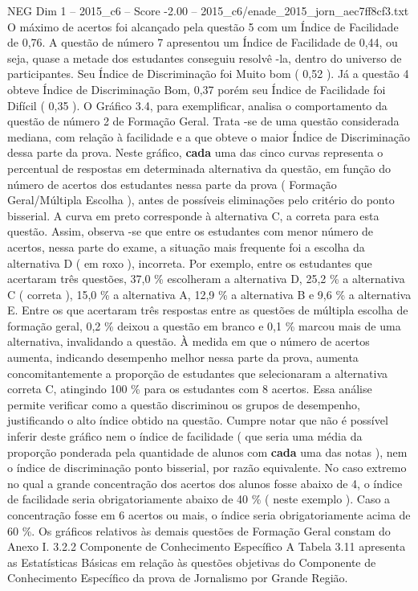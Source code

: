 \begin{textsample}{NEG Dim 1 – 2015\_c6 – Score -2.00 – 2015\_c6/enade\_2015\_jorn\_aec7ff8cf3.txt}
O máximo de acertos foi alcançado pela questão 5 com um Índice de Facilidade de 0,76.
A questão de número 7 apresentou um Índice de Facilidade de 0,44, ou seja, quase a metade dos estudantes conseguiu resolvê -la, dentro do universo de participantes.
Seu Índice de Discriminação foi Muito bom ( 0,52 ).
Já a questão 4 obteve Índice de Discriminação Bom, 0,37 porém seu Índice de Facilidade foi Difícil ( 0,35 ).
O Gráfico 3.4, para exemplificar, analisa o comportamento da questão de número 2 de Formação Geral.
Trata -se de uma questão considerada mediana, com relação à facilidade e a que obteve o maior Índice de Discriminação dessa parte da prova.
Neste gráfico, \textbf{cada} uma das cinco curvas representa o percentual de respostas em determinada alternativa da questão, em função do número de acertos dos estudantes nessa parte da prova ( Formação Geral/Múltipla Escolha ), antes de possíveis eliminações pelo critério do ponto bisserial.
A curva em preto corresponde à alternativa C, a correta para esta questão.
Assim, observa -se que entre os estudantes com menor número de acertos, nessa parte do exame, a situação mais frequente foi a escolha da alternativa D ( em roxo ), incorreta.
Por exemplo, entre os estudantes que acertaram três questões, 37,0 \% escolheram a alternativa D, 25,2 \% a alternativa C ( correta ), 15,0 \% a alternativa A, 12,9 \% a alternativa B e 9,6 \% a alternativa E.
Entre os que acertaram três respostas entre as questões de múltipla escolha de formação geral, 0,2 \% deixou a questão em branco e 0,1 \% marcou mais de uma alternativa, invalidando a questão.
À medida em que o número de acertos aumenta, indicando desempenho melhor nessa parte da prova, aumenta concomitantemente a proporção de estudantes que selecionaram a alternativa correta C, atingindo 100 \% para os estudantes com 8 acertos.
Essa análise permite verificar como a questão discriminou os grupos de desempenho, justificando o alto índice obtido na questão.
Cumpre notar que não é possível inferir deste gráfico nem o índice de facilidade ( que seria uma média da proporção ponderada pela quantidade de alunos com \textbf{cada} uma das notas ), nem o índice de discriminação ponto bisserial, por razão equivalente.
No caso extremo no qual a grande concentração dos acertos dos alunos fosse abaixo de 4, o índice de facilidade seria obrigatoriamente abaixo de 40 \% ( neste exemplo ).
Caso a concentração fosse em 6 acertos ou mais, o índice seria obrigatoriamente acima de 60 \%.
Os gráficos relativos às demais questões de Formação Geral constam do Anexo I. 3.2.2 Componente de Conhecimento Específico A Tabela 3.11 apresenta as Estatísticas Básicas em relação às questões objetivas do Componente de Conhecimento Específico da prova de Jornalismo por Grande Região.

\end{textsample}
